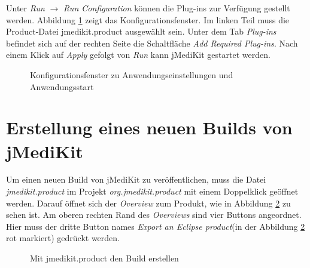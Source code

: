 Unter \textit{Run} $\rightarrow$ \textit{Run Configuration} können die Plug-ins zur Verfügung gestellt werden. Abbildung \ref{addplugins} zeigt das Konfigurationsfenster. Im linken Teil muss die Product-Datei jmedikit.product ausgewählt sein. Unter dem Tab \textit{Plug-ins} befindet sich auf der rechten Seite die Schaltfläche \textit{Add Required Plug-ins}. Nach einem Klick auf \textit{Apply} gefolgt von \textit{Run} kann jMediKit gestartet werden.

\begin{figure}[H]
  \vspace{0.5cm}
  \centering
  \caption{Konfigurationsfenster zu Anwendungseinstellungen und Anwendungsstart}
  \label{addplugins}
  \vspace{0.5cm}
\end{figure}

\section{Erstellung eines neuen Builds von jMediKit}

Um einen neuen Build von jMediKit zu veröffentlichen, muss die Datei \textit{jmedikit.product} im Projekt \textit{org.jmedikit.product} mit einem Doppelklick geöffnet werden. Darauf öffnet sich der \textit{Overview} zum Produkt, wie in Abbildung \ref{build} zu sehen ist. Am oberen rechten Rand des \textit{Overviews} sind vier Buttons angeordnet. Hier muss der dritte Button names \textit{Export an Eclipse product}(in der Abbildung \ref{build} rot markiert) gedrückt werden.

\begin{figure}[H]
  \vspace{0.5cm}
  \centering
  \caption {Mit jmedikit.product den Build erstellen}
  \label{build}
  \vspace{0.5cm}
\end{figure}

